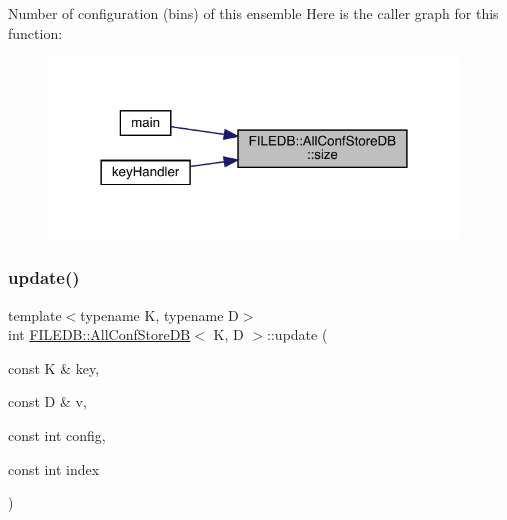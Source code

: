 Number of configuration (bins) of this ensemble Here is the caller graph for this function\+:
\nopagebreak
\begin{figure}[H]
\begin{center}
\leavevmode
\includegraphics[width=309pt]{df/db6/classFILEDB_1_1AllConfStoreDB_a78dd830c5211b3b00b8eae6170ffc9d6_icgraph}
\end{center}
\end{figure}
\mbox{\label{classFILEDB_1_1AllConfStoreDB_a3beaa117f0ddf32de13d5f96643b626c}} 
\subsubsection{\texorpdfstring{update()}{update()}\hspace{0.1cm}{\footnotesize\ttfamily [1/3]}}
{\footnotesize\ttfamily template$<$typename K, typename D$>$ \\
int \mbox{\hyperlink{classFILEDB_1_1AllConfStoreDB}{F\+I\+L\+E\+D\+B\+::\+All\+Conf\+Store\+DB}}$<$ K, D $>$\+::update (\begin{DoxyParamCaption}\item[{const K \&}]{key,  }\item[{const D \&}]{v,  }\item[{const int}]{config,  }\item[{const int}]{index }\end{DoxyParamCaption})\hspace{0.3cm}{\ttfamily [inline]}}

